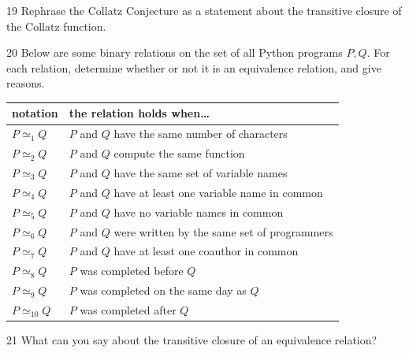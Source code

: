 \begin{exercise}{19}
    Rephrase the Collatz Conjecture as a statement about the transitive closure
    of the Collatz function.
\end{exercise}
\begin{solbox}
\begin{solution}

\end{solution}
\end{solbox}

\begin{exercise}{20}
    Below are some binary relations on the set of all Python programs $P,Q$. For
    each relation, determine whether or not it is an equivalence relation, and
    give reasons.
    \begin{center}
    \begin{tabular}{ll}
        notation & the relation holds when\ldots\\\hline
        $P\simeq_1 Q$ & $P$ and $Q$ have the same number of characters\\
        $P\simeq_2 Q$ & $P$ and $Q$ compute the same function\\
        $P\simeq_3 Q$ & $P$ and $Q$ have the same set of variable names\\
        $P\simeq_4 Q$ & $P$ and $Q$ have at least one variable name in common\\
        $P\simeq_5 Q$ & $P$ and $Q$ have no variable names in common\\
        $P\simeq_6 Q$ & $P$ and $Q$ were written by the same set of programmers\\
        $P\simeq_7 Q$ & $P$ and $Q$ have at least one coauthor in common\\
        $P\simeq_8 Q$ & $P$ was completed before $Q$\\
        $P\simeq_9 Q$ & $P$ was completed on the same day as $Q$\\
        $P\simeq_{10} Q$ & $P$ was completed after $Q$
    \end{tabular}
    \end{center}
\end{exercise}
\begin{solbox}
\begin{solution}

\end{solution}
\end{solbox}

\begin{exercise}{21}
    What can you say about the transitive closure of an equivalence relation?
\end{exercise}

